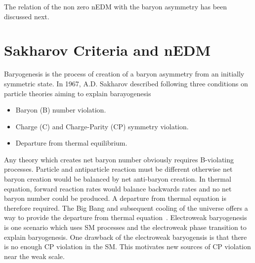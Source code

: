 The relation of the non zero nEDM with the baryon asymmetry has been discussed next.

\section{Sakharov Criteria and nEDM}
Baryogenesis is the process of creation of a baryon asymmetry from an initially symmetric state. In 1967, A.D. Sakharov described following three conditions on particle theories aiming to explain barayogenesis~\cite{Sakharov:1967dj}
\begin{itemize}
    \item Baryon (B) number violation.
    \item Charge (C) and Charge-Parity (CP) symmetry violation.
    \item Departure from thermal equilibrium.
\end{itemize}

Any theory which creates net baryon number obviously requires B-violating processes. Particle and antiparticle reaction must be different otherwise net baryon creation would be balanced by net anti-baryon creation. In thermal equation, forward reaction rates would balance backwards rates and no net baryon number could be produced. A departure from thermal equation is therefore required. The Big Bang and subsequent cooling of the universe offers a way to provide the departure from thermal equation~\cite{sakharov_3rd_cond}. Electroweak baryogenesis is one scenario which uses SM processes and the electroweak phase transition to explain baryogenesis. One drawback of the electroweak baryogensis is that there is no enough CP violation in the SM. This motivates new sources of CP violation near the weak scale.


